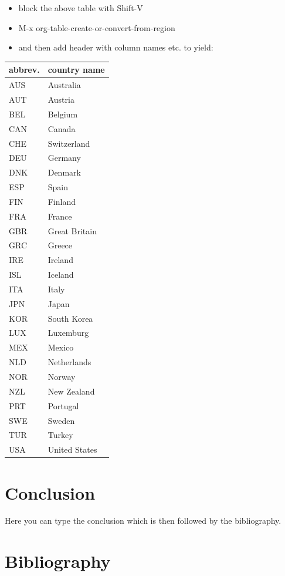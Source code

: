 \documentclass[11pt]{article}
\begin{document}
\begin{itemize}
\item block the above table with Shift-V
\item M-x org-table-create-or-convert-from-region
\item and then add header with column names etc. to yield:
\end{itemize}

\begin{center}
\begin{tabular}{ll}
abbrev. & country name\\
\hline
AUS & Australia\\
AUT & Austria\\
BEL & Belgium\\
CAN & Canada\\
CHE & Switzerland\\
DEU & Germany\\
DNK & Denmark\\
ESP & Spain\\
FIN & Finland\\
FRA & France\\
GBR & Great Britain\\
GRC & Greece\\
IRE & Ireland\\
ISL & Iceland\\
ITA & Italy\\
JPN & Japan\\
KOR & South Korea\\
LUX & Luxemburg\\
MEX & Mexico\\
NLD & Netherlands\\
NOR & Norway\\
NZL & New Zealand\\
PRT & Portugal\\
SWE & Sweden\\
TUR & Turkey\\
USA & United States\\
\end{tabular}
\end{center}


\section{Conclusion}
\label{sec:org691ca0f}

Here you can type the conclusion which is then followed by the bibliography.

\section{Bibliography}
\label{sec:org4815241}
\end{document}
